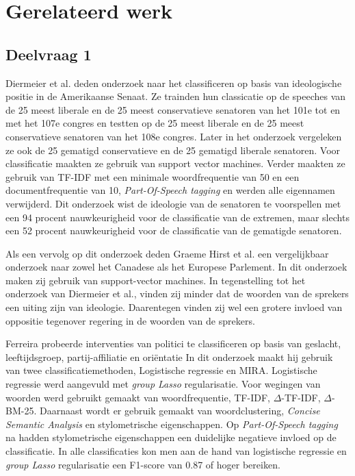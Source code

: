 \section{Gerelateerd werk}
\label{sec:rel}




\subsection{Deelvraag 1}
\label{sec:Deelvraag1}
Diermeier et al. deden onderzoek naar het classificeren op basis van ideologische positie in de Amerikaanse Senaat\cite{diermeier_godbout_yu_kaufmann_2012}. Ze trainden hun classicatie op de speeches van de 25 meest liberale en de 25 meest conservatieve senatoren van het 101e tot en met het 107e congres en testten op de 25 meest liberale en de 25 meest conservatieve senatoren van het 108e congres. Later in het onderzoek vergeleken ze ook de 25 gematigd conservatieve  en de 25 gematigd liberale senatoren. Voor classificatie maakten ze gebruik van support vector machines. Verder maakten ze gebruik van TF-IDF met een minimale woordfrequentie van 50 en een documentfrequentie van 10, \textit{Part-Of-Speech tagging} en werden alle eigennamen verwijderd. Dit onderzoek wist de ideologie van de senatoren te voorspellen met een 94 procent nauwkeurigheid voor de classificatie van de extremen, maar slechts een 52 procent nauwkeurigheid voor de classificatie van de gematigde senatoren.\par
Als een vervolg op dit onderzoek deden Graeme Hirst et al. een vergelijkbaar onderzoek naar zowel het Canadese als het Europese Parlement\cite{Hirst_textto}. In dit onderzoek maken zij gebruik van support-vector machines. In tegenstelling tot het onderzoek van Diermeier et al., vinden zij minder dat de woorden van de sprekers een uiting zijn van ideologie. Daarentegen vinden zij wel een grotere invloed van oppositie tegenover regering in de woorden van de sprekers.\par
Ferreira probeerde interventies van politici te classificeren op basis van geslacht, leeftijdsgroep, partij-affiliatie en ori\"{e}ntatie\cite{Ferreira2016UsingTT} In dit onderzoek maakt hij gebruik van twee classificatiemethoden, Logistische regressie en MIRA. Logistische regressie werd aangevuld met \textit{group Lasso} regularisatie. Voor wegingen van woorden werd gebruikt gemaakt van woordfrequentie, TF-IDF, $\Delta$-TF-IDF, $\Delta$-BM-25. Daarnaast wordt er gebruik gemaakt van woordclustering, \textit{Concise Semantic Analysis} en stylometrische eigenschappen. Op \textit{Part-Of-Speech tagging} na hadden stylometrische eigenschappen een duidelijke negatieve invloed op de classificatie. In alle classificaties kon men aan de hand van logistische regressie en \textit{group Lasso} regularisatie een F1-score van 0.87 of hoger bereiken.\par

